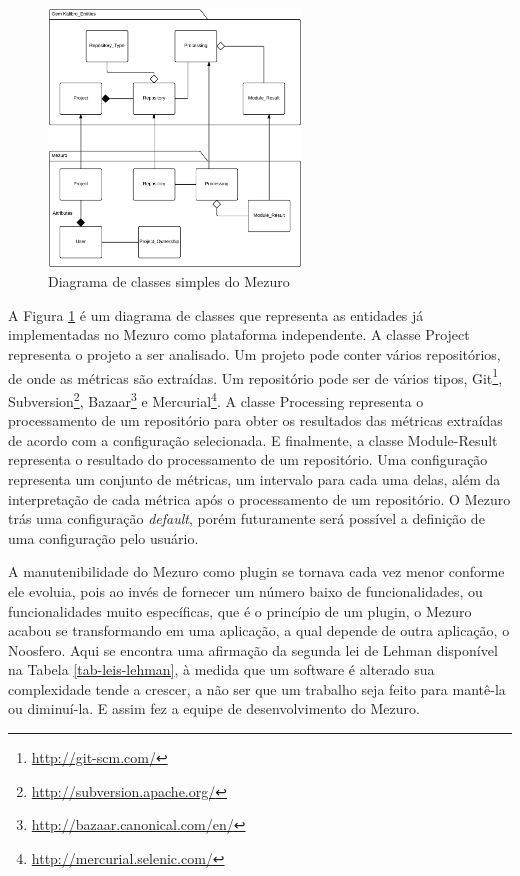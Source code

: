 \graphicspath{{figuras/}}
\begin{figure}[H]
\centering
\includegraphics[width=0.6\textwidth]{class-diagram-mezuro}
\caption{Diagrama de classes simples do Mezuro}
\label{class-diagram}
\end{figure}

A Figura \ref{class-diagram} é um diagrama de classes que representa as entidades já implementadas no Mezuro como plataforma independente. A classe Project representa o projeto a ser analisado. Um projeto pode conter vários repositórios, de onde as métricas são extraídas.  Um repositório pode ser de vários tipos, Git\footnote{\url{http://git-scm.com/}}, Subversion\footnote{\url{http://subversion.apache.org/}}, Bazaar\footnote{\url{http://bazaar.canonical.com/en/}} e Mercurial\footnote{\url{http://mercurial.selenic.com/}}. A classe Processing representa o processamento de um repositório para obter os resultados das métricas extraídas de acordo com a configuração selecionada. E finalmente, a classe Module-Result representa o resultado do processamento de um repositório. Uma configuração representa um conjunto de métricas, um intervalo para cada uma delas, além da interpretação de cada métrica após o processamento de um repositório. O Mezuro trás uma configuração \textit{default}, porém futuramente será possível a definição de uma configuração pelo usuário.

A manutenibilidade do Mezuro como plugin se tornava cada vez menor conforme ele evoluia, pois ao invés de fornecer um número baixo de funcionalidades, ou funcionalidades muito específicas, que é o princípio de um plugin, o Mezuro acabou se transformando em uma aplicação, a qual depende de outra aplicação, o Noosfero. Aqui se encontra uma afirmação da segunda lei de Lehman disponível na Tabela \ref{tab-leis-lehman}, à medida que um software é alterado sua complexidade tende a crescer, a não ser que um trabalho seja feito para mantê-la ou diminuí-la. E assim fez a equipe de desenvolvimento do Mezuro.


